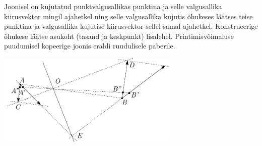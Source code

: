 
Joonisel on kujutatud punktvalgusallikas punktina ja selle valgusallika kiirusvektor mingil ajahetkel ning selle valgusallika kujutis õhukeses läätses teise punktina ja valgusallika kujutise kiirusvektor sellel samal ajahetkel. Konstrueerige õhukese läätse asukoht (tasand ja keskpunkt) lisalehel. Printimisvõimaluse puudumisel kopeerige joonis eraldi ruudulisele paberile.
\begin{center}
	\includegraphics[width=0.65\textwidth]{2021-v2g-09-yl.pdf}
\end{center}



\hint

